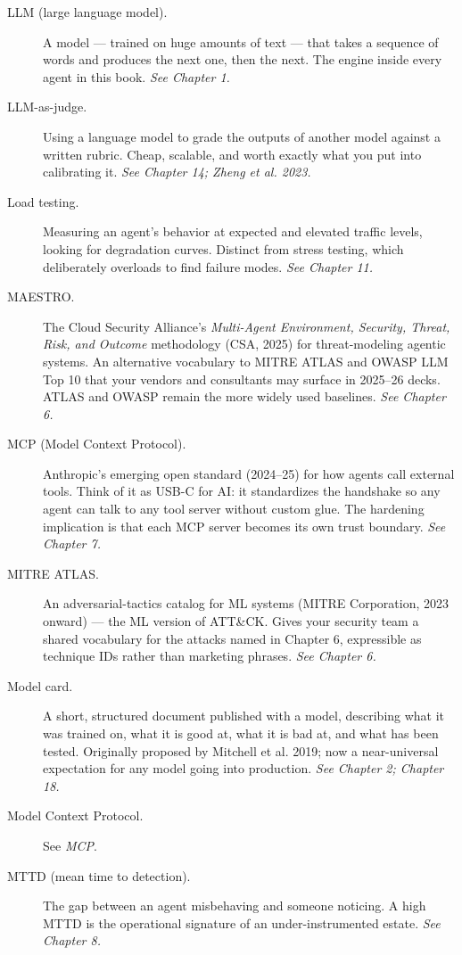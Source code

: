 \begin{description}
  \item[LLM (large language model).] A model — trained on huge amounts of text — that takes a sequence of words and produces the next one, then the next. The engine inside every agent in this book. \textit{See Chapter 1.}
  \item[LLM-as-judge.] Using a language model to grade the outputs of another model against a written rubric. Cheap, scalable, and worth exactly what you put into calibrating it. \textit{See Chapter 14; Zheng et al. 2023.}
  \item[Load testing.] Measuring an agent's behavior at expected and elevated traffic levels, looking for degradation curves. Distinct from stress testing, which deliberately overloads to find failure modes. \textit{See Chapter 11.}
  \item[MAESTRO.] The Cloud Security Alliance's \textit{Multi-Agent Environment, Security, Threat, Risk, and Outcome} methodology (CSA, 2025) for threat-modeling agentic systems. An alternative vocabulary to MITRE ATLAS and OWASP LLM Top 10 that your vendors and consultants may surface in 2025–26 decks. ATLAS and OWASP remain the more widely used baselines. \textit{See Chapter 6.}
  \item[MCP (Model Context Protocol).] Anthropic's emerging open standard (2024–25) for how agents call external tools. Think of it as USB-C for AI: it standardizes the handshake so any agent can talk to any tool server without custom glue. The hardening implication is that each MCP server becomes its own trust boundary. \textit{See Chapter 7.}
  \item[MITRE ATLAS.] An adversarial-tactics catalog for ML systems (MITRE Corporation, 2023 onward) — the ML version of ATT\&CK. Gives your security team a shared vocabulary for the attacks named in Chapter 6, expressible as technique IDs rather than marketing phrases. \textit{See Chapter 6.}
  \item[Model card.] A short, structured document published with a model, describing what it was trained on, what it is good at, what it is bad at, and what has been tested. Originally proposed by Mitchell et al. 2019; now a near-universal expectation for any model going into production. \textit{See Chapter 2; Chapter 18.}
  \item[Model Context Protocol.] See \textit{MCP}.
  \item[MTTD (mean time to detection).] The gap between an agent misbehaving and someone noticing. A high MTTD is the operational signature of an under-instrumented estate. \textit{See Chapter 8.}

\end{description}
